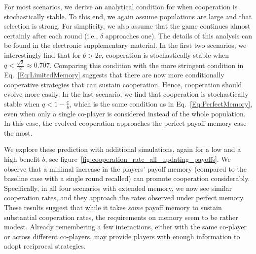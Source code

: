 \documentclass[11pt]{article}
\def\esm{electronic supplementary material}
\newcommand{\FigHigherMemory}{figure~\ref{fig:cooperation_rate_all_updating_payoffs}}
\theoremstyle{plainCl1}
\theoremstyle{plainCl2}
\begin{document}
For most scenarios, we derive an analytical condition for when cooperation is stochastically stable. 
To this end, we again assume populations are large and that selection is strong. 
For simplicity, we also assume that the game continues almost certainly after each round (i.e., $\delta$ approaches one). 
The details of this analysis can be found in the \esm. 
In the first two scenarios, we interestingly find that for $b\!>\!2c$, cooperation is stochastically stable when $q\!<\! \frac{\sqrt{2}}{2}\approx 0.707$. 
Comparing this condition with the more stringent condition in Eq.~\eqref{Eq:LimitedMemory} suggests that there are now more conditionally cooperative strategies that can sustain cooperation. 
Hence, cooperation should evolve more easily.
In the last scenario, we find that cooperation is stochastically stable when \(q
< 1 - \frac{c}{b}\), which is the same condition as in
Eq.~\eqref{Eq:PerfectMemory}, even when only a single co-player is considered
instead of the whole population. In this case, the evolved cooperation
approaches the perfect payoff memory case the most.


We explore these prediction with additional simulations, again for a low and a high benefit $b$, 
see \FigHigherMemory.
We observe that a minimal increase in the players' payoff memory (compared to the baseline case with a single round recalled) can promote cooperation considerably. 
Specifically, in all four scenarios with extended memory, we now see similar cooperation rates, and they approach the rates observed under perfect memory. 
These results suggest that while it takes {\it some} payoff memory to sustain substantial cooperation rates, the requirements on memory seem to be rather modest. 
Already remembering a few interactions, either with the same co-player or across different co-players, may provide players with enough information to adopt reciprocal strategies. 



\end{document}
